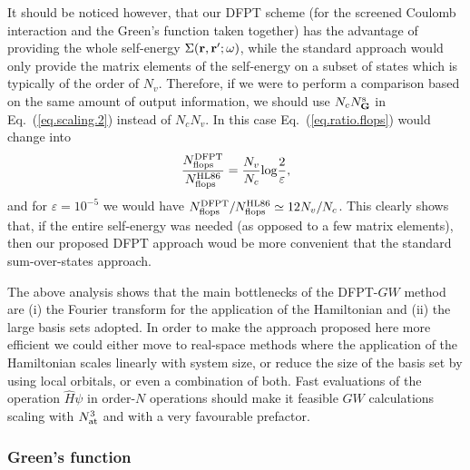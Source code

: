 \documentclass[twocolumn,prb,showpacs,superscriptaddress]{revtex4}
\def\w{\omega}
\def\G{{\bf G}}
\def\r{{\bf r}}
\def\rp{{\bf r^\prime}}
\begin{document}
It should be noticed however, that our DFPT scheme (for the screened Coulomb interaction
and the Green's function taken together) has the advantage of providing
the whole self-energy $\Sigma(\r,\rp;\w)$, while the standard approach would 
only provide the matrix elements of the self-energy on a subset of states which is
typically of the order of $N_v$. Therefore, if we were to perform a comparison based on the
same amount of output information, we should use $N_c N_\G^{\rm s}$ in Eq.\ (\ref{eq.scaling.2})
instead of $N_c N_v$. In this case Eq.\ (\ref{eq.ratio.flops}) would change into
  \begin{equation}
  \frac{N^{\rm DFPT}_{\rm flops}}{N^{\rm HL86}_{\rm flops}} = \frac{N_v }{N_c}{\rm log} \frac{2}{\varepsilon},
  \end{equation}
and for $\varepsilon=10^{-5}$ we would have $N^{\rm DFPT}_{\rm flops}/N^{\rm HL86}_{\rm flops}\simeq 12 N_v/N_c$.
This clearly shows that, if the entire self-energy was needed (as opposed to a few matrix elements),
then our proposed DFPT approach woud be more convenient that the standard sum-over-states
approach.

The above analysis shows that the main bottlenecks of the DFPT-$GW$ method 
are (i) the Fourier transform for the application of the Hamiltonian and (ii) the large basis sets adopted.
In order to make the approach proposed here more efficient we could either
move to real-space methods where the application of the Hamiltonian scales linearly with system size,\cite{chelikowsky}
or reduce the size of the basis set by using local orbitals,\cite{siesta} or even a combination of both.
Fast evaluations of the operation $\hat{H}\psi$ in order-$N$ operations should 
make it feasible $GW$ calculations scaling with $N_{\rm at}^3$ and with a very favourable
prefactor.

\subsubsection{Green's function}\label{sec.green.scaling}
\end{document}
